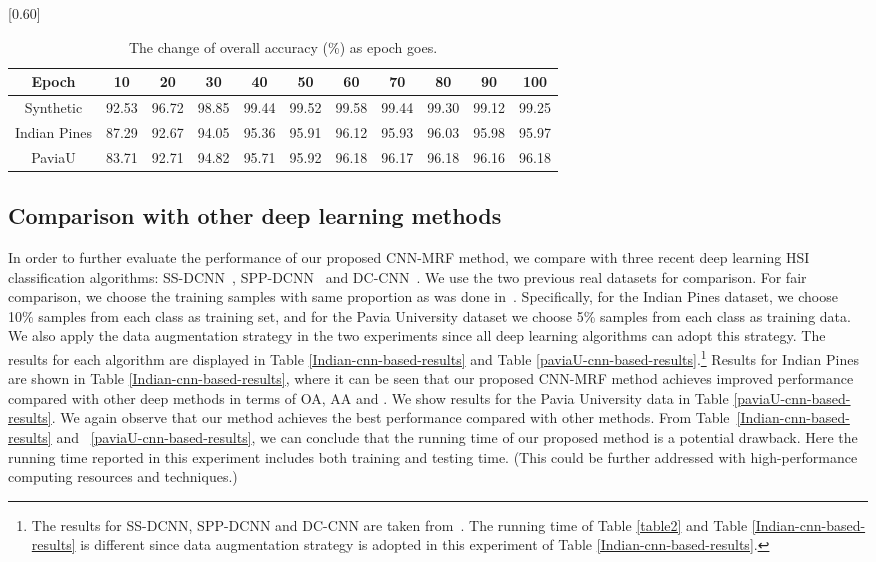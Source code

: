 \documentclass[journal]{IEEEtran}
\begin{document}
		\begin{table}[htp]
			\caption{\label{Epoch_goes} {{The change of overall accuracy (\%) as epoch goes.}}}
			\begin{center}
				{\normalsize
					\scalebox{0.60}[0.60]
					{
						\begin{tabular}{|c|c|c|c|c|c|c|c|c|c|c|}
							\hline
							Epoch & 10  & 20 & 30 & 40 & 50 & 60 & 70  & 80 & 90 & 100\\
							\hline
							Synthetic  & 92.53  & 96.72   & 98.85  & 99.44 & 99.52 & 99.58 & 99.44  & 99.30 & 99.12 & 99.25\\
							\hline
							Indian Pines  & 87.29  & 92.67 & 94.05 & 95.36 & 95.91 & 96.12 & 95.93 & 96.03 & 95.98 & 95.97\\
							\hline
							PaviaU  & 83.71  & 92.71 & 94.82 & 95.71 & 95.92 & 96.18 & 96.17 & 96.18 & 96.16 & 96.18\\
							\hline
						\end{tabular}
					}
				}
			\end{center}
		\end{table}
		
		
		\subsection{Comparison with other deep learning methods }\label{sec.otherdeep}
		In order to further evaluate the performance of our proposed CNN-MRF method, we compare with three recent deep learning HSI classification algorithms: SS-DCNN~\cite{yue2015spectral}, SPP-DCNN~\cite{yue2016deep} and DC-CNN~\cite{zhang2017spectral}. We use the two previous real datasets for comparison. For fair comparison, we choose the training samples with same proportion as was done in~\cite{zhang2017spectral}. Specifically, for the Indian Pines dataset, we choose 10\% samples from each class as training set, and for the Pavia University dataset we choose 5\% samples from each class as training data. We also apply the data augmentation strategy in the two experiments since all deep learning algorithms can adopt this strategy. The results for each algorithm are displayed in Table \ref{Indian-cnn-based-results} and Table \ref{paviaU-cnn-based-results}.\footnote{The results for SS-DCNN, SPP-DCNN and DC-CNN are taken from~\cite{zhang2017spectral}. The running time of Table \ref{table2} and Table {\ref{Indian-cnn-based-results}} is different since data augmentation strategy is adopted in this experiment of Table \ref{Indian-cnn-based-results}.} Results for Indian Pines are shown in Table
		\ref{Indian-cnn-based-results}, where it can be seen that our proposed CNN-MRF method achieves improved performance compared with other deep methods in terms of OA, AA and . We show results for the Pavia University data in Table \ref{paviaU-cnn-based-results}. {{We again observe that our method achieves the best performance compared with other methods. From Table~\ref{Indian-cnn-based-results} and ~\ref{paviaU-cnn-based-results}, we can conclude that the running time of our proposed method is a potential drawback. Here the running time reported in this experiment includes both training and testing time. (This could be further addressed with high-performance computing resources and techniques.)}}
		
\end{document}
